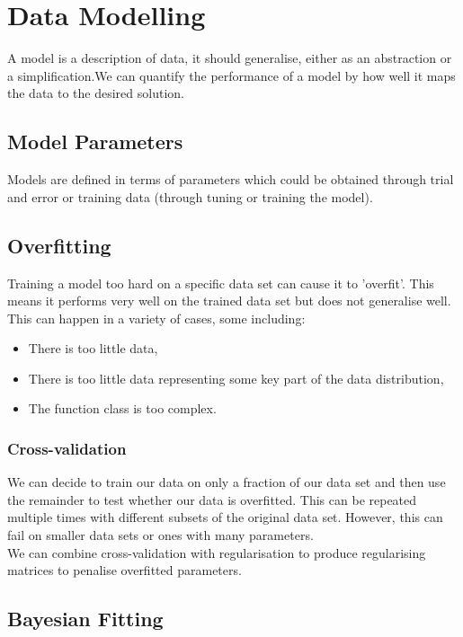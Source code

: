 \section{Data Modelling}

A model is a description of data, it should generalise, either as 
an abstraction or a simplification.We can quantify the performance 
of a model by how well it maps the data to the desired solution.

\subsection{Model Parameters}

Models are defined in terms of parameters which could be obtained
through trial and error or training data (through tuning or
training the model).

\subsection{Overfitting}

Training a model too hard on a specific data set can cause it
to 'overfit'. This means it performs very well on the trained
data set but does not generalise well.
\\[\baselineskip]
This can happen in a variety of cases, some including: \begin{itemize}
    \item There is too little data,
    \item There is too little data representing some
        key part of the data distribution,
    \item The function class is too complex.
\end{itemize}

\subsubsection{Cross-validation}

We can decide to train our data on only a fraction of our data set
and then use the remainder to test whether our data is overfitted.
This can be repeated multiple times with different subsets of the
original data set. However, this can fail on smaller data sets or
ones with many parameters.
\\[\baselineskip]
We can combine cross-validation with regularisation to produce
regularising matrices to penalise overfitted parameters.

\subsection{Bayesian Fitting}

